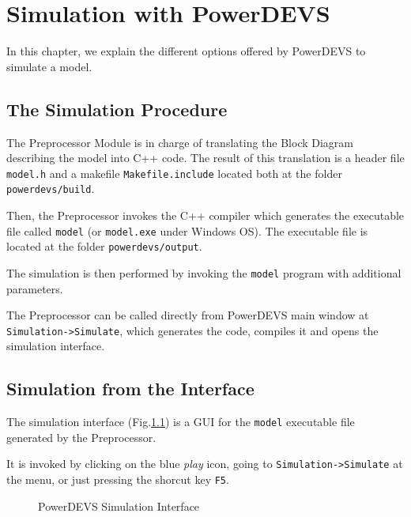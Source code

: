 \chapter{Simulation with PowerDEVS}
In this chapter, we explain the different options offered by PowerDEVS to simulate a model.

\section{The Simulation Procedure}
The Preprocessor Module is in charge of translating the Block Diagram describing the model into C++ code. 
The result of this translation is a header file \verb"model.h" and a makefile \verb"Makefile.include" located both at the folder \verb"powerdevs/build".

Then, the Preprocessor invokes the C++ compiler which generates the executable file called \verb"model" (or \verb"model.exe" under Windows OS). The executable file is located at the folder \verb"powerdevs/output".

The simulation is then performed by invoking the \verb"model" program with additional parameters.

The Preprocessor can be called directly from PowerDEVS main window at \verb"Simulation->Simulate", which generates the code, compiles it and opens the simulation interface.

\section{Simulation from the Interface}
The simulation interface (Fig.\ref{fig:sim_interface}) is a GUI for the \verb"model" executable file generated by the Preprocessor.

It is invoked by clicking on the blue \emph{play} icon, going to \verb"Simulation->Simulate" at the menu, or just pressing the shorcut key \verb"F5". 

\begin{figure}[h]
 \caption{PowerDEVS Simulation Interface}
 \label{fig:sim_interface}
\end{figure} 

